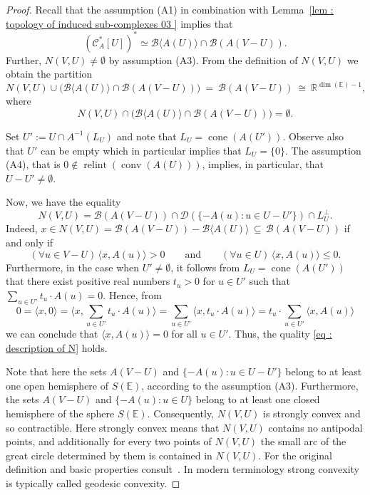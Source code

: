 \documentclass[a4paper,11pt,reqno, english]{amsart}
\theoremstyle{definition}
\theoremstyle{remark}
\newcommand\R{\mathbb R}
\newcommand\CC{\mathscr C}
\newcommand\E{\mathbb{E}}
\DeclareMathOperator{\cone}{\mathrm{cone}}
\DeclareMathOperator{\relint}{\mathrm{relint}}
\DeclareMathOperator{\conv}{\mathrm{conv}}
\begin{document}
\begin{proof}
	Recall that the assumption (A1) in combination with Lemma~\ref{lem : topology of induced sub-complexes 03 } implies that
	\[
		(\CC_A^*[U])^*  \simeq \mathscr{B}\langle A(U)\rangle\cap \mathscr{B}(A(V-U)) .
	\]
	Further,  $N(V,U)\neq\emptyset$ by assumption (A3).
	From the definition of $N(V,U)$ we obtain the partition
	\[
		N(V,U)\cup\big( \mathscr{B}\langle A(U)\rangle\cap \mathscr{B}(A(V-U))\big) \ = \ \mathscr{B}(A(V-U)) \ \cong \ \R^{\dim(\E)-1},
	\]
	where
	\[
		N(V,U)\cap \big( \mathscr{B}\langle A(U)\rangle\cap \mathscr{B}(A(V-U))\big)=\emptyset.
	\]

	\medskip
	Set $U':=U\cap A^{-1}(L_U)$ and note that $L_U=\cone(A(U'))$.
	Observe also that $U'$ can be empty which in particular implies that $L_U=\{0\}$.
	The assumption (A4), that is $0\notin\relint(\conv (A(U)))$, implies, in particular, that $U-U'\neq\emptyset$.

	\medskip
	Now, we have the equality
	\begin{equation}
		\label{eq : description of N}
		N(V,U)=  \mathscr{B}(A(V-U)) \cap \mathscr{D}(\{-A(u) : u\in U-U'\})\cap L_U^{\perp}.
	\end{equation}
	Indeed, $x\in N(V,U)=\mathscr{B}(A(V-U))-\mathscr{B}\langle A(U)\rangle \, \subseteq \, \mathscr{B}(A(V-U))$ if and only if
	\[
		(\forall u\in V-U)\, \langle x,A(u)\rangle >0\qquad\text{and}\qquad (\forall u\in U)\, \langle x,A(u)\rangle \leq 0.
	\]
	Furthermore, in the case when $U'\neq\emptyset$, it follows from $L_U=\cone(A(U'))$ that there exist positive real numbers $t_{u}>0$ for $u\in U'$ such that $\sum_{u\in U'}t_u\cdot A(u)=0$.
	Hence, from
	\[
		0=\langle x,0\rangle = \langle x, \sum_{u\in U'}t_u\cdot A(u)\rangle=\sum_{u\in U'}\langle x,  t_u\cdot A(u)\rangle =t_u\cdot\sum_{u\in U'}\langle x,   A(u)\rangle
	\]
	we can conclude that $\langle x, A(u)\rangle=0$ for all $u\in U'$.
	Thus, the quality \eqref{eq : description of N} holds.

	\medskip
	Note that here the sets $A(V-U)$ and $\{-A(u) : u\in U-U'\}$ belong to at least one open hemisphere of $S(\E)$, according to the assumption (A3).
	Furthermore, the sets $A(V-U)$ and $\{-A(u) : u\in U\}$ belong to at least one closed hemisphere of the sphere $S(\E)$.
	Consequently, $N(V,U)$ is strongly convex and so contractible.
	Here strongly convex means that $N(V,U)$ contains no antipodal points, and additionally for every two points of $N(V,U)$ the small arc of the great circle determined by them is contained in $N(V,U)$.
	For the original definition and basic properties consult~\cite[Sec.\,9.1.\,(S)]{DanzerEtAl1963}.
	In modern terminology strong convexity is typically called geodesic convexity.



\end{proof}
\end{document}

